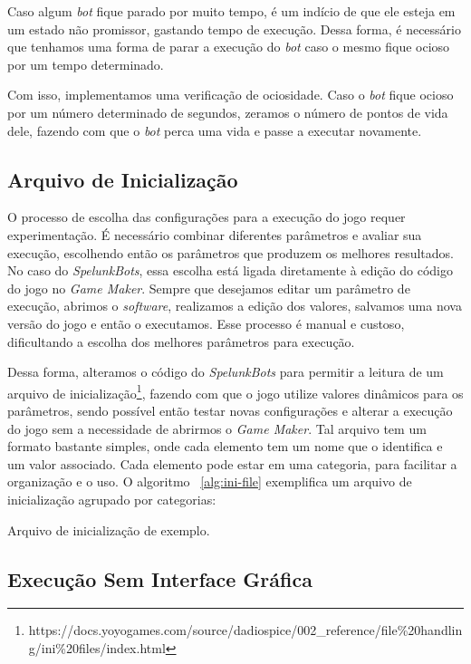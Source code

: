 Caso algum \textit{bot} fique parado por muito tempo, é um indício de que ele
esteja em um estado não promissor, gastando tempo de execução. Dessa forma, é
necessário que tenhamos uma forma de parar a execução do \textit{bot} caso o
mesmo fique ocioso por um tempo determinado.

Com isso, implementamos uma verificação de ociosidade. Caso o \textit{bot}
fique ocioso por um número determinado de segundos, zeramos o número de pontos
de vida dele, fazendo com que o \textit{bot} perca uma vida e passe a executar
novamente.

\subsection{Arquivo de Inicialização}

O processo de escolha das configurações para a execução do jogo requer
experimentação. É necessário combinar diferentes parâmetros e avaliar sua
execução, escolhendo então os parâmetros que produzem os melhores resultados.
No caso do \textit{SpelunkBots}, essa escolha está ligada diretamente à edição
do código do jogo no \textit{Game Maker}. Sempre que desejamos editar um
parâmetro de execução, abrimos o \textit{software}, realizamos a edição dos
valores, salvamos uma nova versão do jogo e então o executamos. Esse processo é
manual e custoso, dificultando a escolha dos melhores parâmetros para execução.  

Dessa forma, alteramos o código do \textit{SpelunkBots} para permitir a leitura
de um arquivo de
inicialização\footnote{https://docs.yoyogames.com/source/dadiospice/002\_reference/file\%20handling/ini\%20files/index.html},
fazendo com que o jogo utilize valores dinâmicos para os parâmetros, sendo
possível então testar novas configurações e alterar a execução do jogo sem
a necessidade de abrirmos o \textit{Game Maker}. Tal arquivo tem um formato
bastante simples, onde cada elemento tem um nome que o identifica e um
valor associado. Cada elemento pode estar em uma categoria, para facilitar
a organização e o uso. O algoritmo ~\ref{alg:ini-file} exemplifica um
arquivo de inicialização agrupado por categorias:

\begin{algorithm}[H]

\caption[Arquivo de inicialização de exemplo.]
{\label{alg:ini-file}Arquivo de inicialização de exemplo.}
\end{algorithm}

\subsection{Execução Sem Interface Gráfica}

